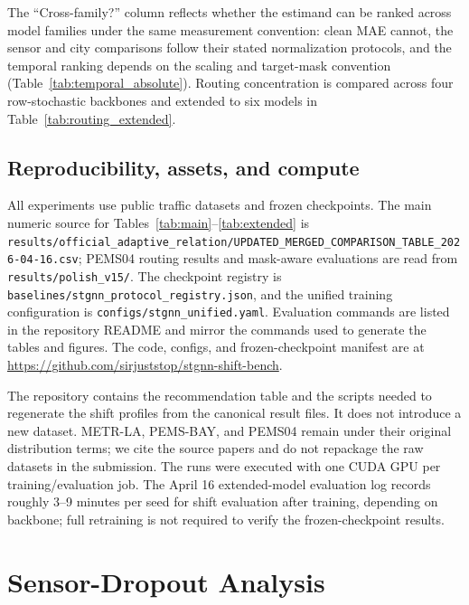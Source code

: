 The ``Cross-family?'' column reflects whether the estimand can be ranked
across model families under the same measurement convention: clean MAE
cannot, the sensor and city comparisons follow their stated normalization
protocols, and the temporal ranking depends on the scaling and target-mask
convention (Table~\ref{tab:temporal_absolute}). Routing concentration is
compared across four row-stochastic backbones and extended to six models
in Table~\ref{tab:routing_extended}.

\subsection{Reproducibility, assets, and compute}
\label{sec:appendix_reproducibility}

All experiments use public traffic datasets and frozen checkpoints. The main
numeric source for Tables~\ref{tab:main}--\ref{tab:extended} is
\texttt{results/official\_adaptive\_relation/}\allowbreak\texttt{UPDATED\_MERGED\_COMPARISON\_TABLE\_2026-04-16.csv};
PEMS04 routing results and mask-aware evaluations are read from
\texttt{results/polish\_v15/}. The checkpoint registry is
\texttt{baselines/stgnn\_protocol\_registry.json}, and the unified training
configuration is \texttt{configs/stgnn\_unified.yaml}. Evaluation commands are
listed in the repository README and mirror the commands used to generate the
tables and figures. The code, configs, and frozen-checkpoint manifest are at
\url{https://github.com/sirjuststop/stgnn-shift-bench}.

The repository contains the recommendation table and the scripts needed
to regenerate the shift profiles from the canonical result files. It does not
introduce a new dataset. METR-LA, PEMS-BAY, and PEMS04 remain under their
original distribution terms; we cite the source papers and do not repackage the
raw datasets in the submission. The runs were executed with one CUDA GPU per
training/evaluation job. The April 16 extended-model evaluation log records
roughly 3--9 minutes per seed for shift evaluation after training, depending on
backbone; full retraining is not required to verify the frozen-checkpoint
results.

\section{Sensor-Dropout Analysis}
\label{sec:appendix_sensor_group}

